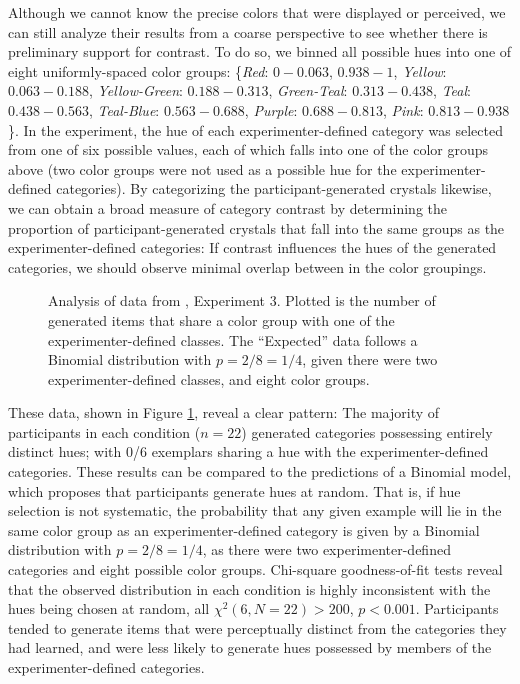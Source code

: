 \documentclass[12pt]{article}
\newcommand\inputpgf[2]{{
\let\pgfimageWithoutPath\pgfimage
\renewcommand{\pgfimage}[2][]{\pgfimageWithoutPath[##1]{#1/##2}}

}}
\begin{document}
\begin{flushleft}
Although we cannot know the precise colors that were displayed or perceived, we
can still analyze their results from a coarse perspective to see whether there
is preliminary support for contrast. To do so, we binned all possible hues into
one of eight uniformly-spaced color groups: \{{\em Red}: $0-0.063$, $0.938-1$,
{\em Yellow}: $0.063-0.188$, {\em Yellow-Green}: $0.188-0.313$, {\em
Green-Teal}: $0.313-0.438$, {\em Teal}: $0.438-0.563$, {\em Teal-Blue}:
$0.563-0.688$, {\em Purple}: $0.688-0.813$, {\em Pink}: $0.813-0.938$\}. In the
\cite{jern2013probabilistic} experiment, the hue of each experimenter-defined
category was selected from one of six possible values, each of which falls into
one of the color groups above (two color groups were not used as a possible hue
for the experimenter-defined categories). By categorizing the
participant-generated crystals likewise, we can obtain a broad measure of
category contrast by determining the proportion of participant-generated
crystals that fall into the same groups as the experimenter-defined categories:
If contrast influences the hues of the generated categories, we should observe
minimal overlap between in the color groupings.



\begin{figure}
    \begin{center} \inputpgf{figs/}{jk13-huecontrast.pgf}
        \caption{Analysis of data from \cite{jern2013probabilistic}, Experiment
3. Plotted is the number of generated items that share a color group with one of
the experimenter-defined classes. The ``Expected'' data follows a Binomial
distribution with $p=2/8=1/4$, given there were two experimenter-defined
classes, and eight color groups.}
        \label{fig:jk13-huecontrast}
    \end{center}
\end{figure}

These data, shown in Figure \ref{fig:jk13-huecontrast}, reveal a clear pattern:
The majority of participants in each condition ($n = 22$) generated categories
possessing entirely distinct hues; with 0/6 exemplars sharing a hue with the
experimenter-defined categories. These results can be compared to the
predictions of a Binomial model, which proposes that participants generate hues
at random. That is, if hue selection is not systematic, the probability that any
given example will lie in the same color group as an experimenter-defined
category is given by a Binomial distribution with $p = 2/8=1/4$, as there were
two experimenter-defined categories and eight possible color groups. Chi-square
goodness-of-fit tests reveal that the observed distribution in each condition is
highly inconsistent with the hues being chosen at random, all
$\chi^2(6,N=22)>200$, $p<0.001$. Participants tended to generate items that were
perceptually distinct from the categories they had learned, and were less likely
to generate hues possessed by members of the experimenter-defined categories.


\end{flushleft}
\end{document}
